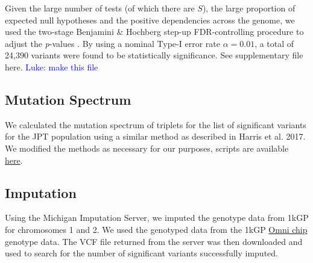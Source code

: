 \documentclass[9pt,lineno]{elife}
\newcommand{\luke}[1]{\textcolor{blue}{Luke: #1}}
\begin{document}
Given the large number of tests (of which there are $S$), the large proportion of expected null hypotheses and the positive dependencies across the genome, we used the two-stage Benjamini \& Hochberg step-up FDR-controlling procedure to adjust the \textit{p}-values \citep{Benjamini2006}.
By using a nominal Type-I error rate $\alpha = 0.01$, a total of 24,390 variants were found to be statistically significance. See supplementary file {here}. \luke{make this file}

\subsection{Mutation Spectrum}
We calculated the mutation spectrum of triplets for the list of significant variants for the JPT population using a similar method as described in Harris et al. 2017. \citep{Harris2017a}
We modified the methods as necessary for our purposes, scripts are available \href{https://github.com/LukeAndersonTrocme/QualityPaper}{here}. 

\subsection{Imputation}
Using the Michigan Imputation Server, we imputed the genotype data from 1kGP for chromosomes 1 and 2.
We used the genotyped data from the 1kGP \href{ftp://ftp.1000genomes.ebi.ac.uk/vol1/ftp/release/20130502/supporting/hd_genotype_chip/ALL.chip.omni_broad_sanger_combined.20140818.snps.genotypes.vcf.gz}{Omni chip} genotype data.
The VCF file returned from the server was then downloaded and used to search for the number of significant variants successfully imputed. 


\end{document}
